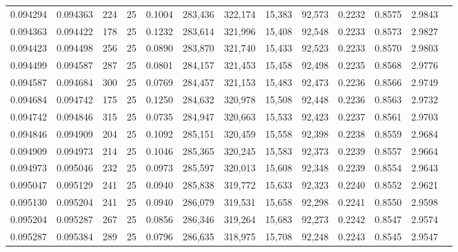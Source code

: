 \begin{tabular}{rrrrrrrrrrrrr}
0.094294 & 0.094363 &   224 &  25 &                                     0.1004 & 283,436 & 322,174 &  15,383 &  92,573 & 0.2232 & 0.8575 & 2.9843 \\
0.094363 & 0.094422 &   178 &  25 &                                     0.1232 & 283,614 & 321,996 &  15,408 &  92,548 & 0.2233 & 0.8573 & 2.9827 \\
0.094423 & 0.094498 &   256 &  25 &                                     0.0890 & 283,870 & 321,740 &  15,433 &  92,523 & 0.2233 & 0.8570 & 2.9803 \\
0.094499 & 0.094587 &   287 &  25 &                                     0.0801 & 284,157 & 321,453 &  15,458 &  92,498 & 0.2235 & 0.8568 & 2.9776 \\
0.094587 & 0.094684 &   300 &  25 &                                     0.0769 & 284,457 & 321,153 &  15,483 &  92,473 & 0.2236 & 0.8566 & 2.9749 \\
0.094684 & 0.094742 &   175 &  25 &                                     0.1250 & 284,632 & 320,978 &  15,508 &  92,448 & 0.2236 & 0.8563 & 2.9732 \\
0.094742 & 0.094846 &   315 &  25 &                                     0.0735 & 284,947 & 320,663 &  15,533 &  92,423 & 0.2237 & 0.8561 & 2.9703 \\
0.094846 & 0.094909 &   204 &  25 &                                     0.1092 & 285,151 & 320,459 &  15,558 &  92,398 & 0.2238 & 0.8559 & 2.9684 \\
0.094909 & 0.094973 &   214 &  25 &                                     0.1046 & 285,365 & 320,245 &  15,583 &  92,373 & 0.2239 & 0.8557 & 2.9664 \\
0.094973 & 0.095046 &   232 &  25 &                                     0.0973 & 285,597 & 320,013 &  15,608 &  92,348 & 0.2239 & 0.8554 & 2.9643 \\
0.095047 & 0.095129 &   241 &  25 &                                     0.0940 & 285,838 & 319,772 &  15,633 &  92,323 & 0.2240 & 0.8552 & 2.9621 \\
0.095130 & 0.095204 &   241 &  25 &                                     0.0940 & 286,079 & 319,531 &  15,658 &  92,298 & 0.2241 & 0.8550 & 2.9598 \\
0.095204 & 0.095287 &   267 &  25 &                                     0.0856 & 286,346 & 319,264 &  15,683 &  92,273 & 0.2242 & 0.8547 & 2.9574 \\
0.095287 & 0.095384 &   289 &  25 &                                     0.0796 & 286,635 & 318,975 &  15,708 &  92,248 & 0.2243 & 0.8545 & 2.9547 \\

\end{tabular}
